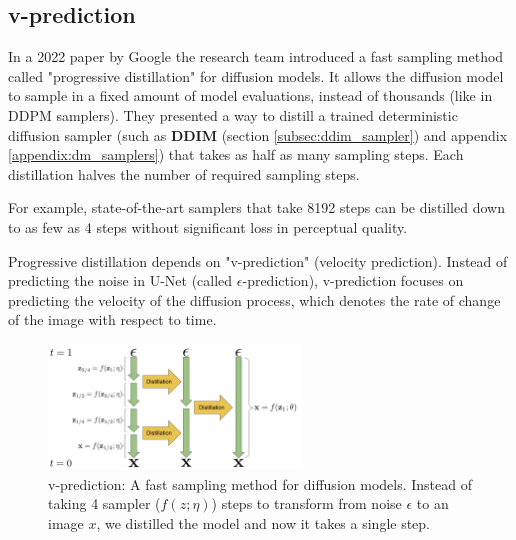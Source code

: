 \subsection{v-prediction}

In a 2022 paper by Google \cite{v_prediction} the research team introduced a fast sampling method called "progressive distillation" for diffusion models. It allows the diffusion model to sample in a fixed amount of model evaluations, instead of thousands (like in DDPM samplers). They presented a way to distill a trained deterministic diffusion sampler (such as \textbf{DDIM} (section \ref{subsec:ddim_sampler}) and appendix \ref{appendix:dm_samplers}) that takes as half as many sampling steps. Each distillation halves the number of required sampling steps.

For example, state-of-the-art samplers that take 8192 steps can be distilled down to as few as 4 steps without significant loss in perceptual quality.

Progressive distillation depends on "v-prediction" (velocity prediction). Instead of predicting the noise in U-Net (called $\epsilon$-prediction), v-prediction focuses on predicting the velocity of the diffusion process, which denotes the rate of change of the image with respect to time.

\begin{figure}
    \centering
    \includegraphics[width=0.6\textwidth]{images/imagen_video/v_prediction.png}
    \caption{v-prediction: A fast sampling method for diffusion models. Instead of taking 4 sampler ($f(z; \eta)$) steps to transform from noise $\epsilon$ to an image $x$, we distilled the model and now it takes a single step.}
    \label{fig:progressive_distillation}
\end{figure}

